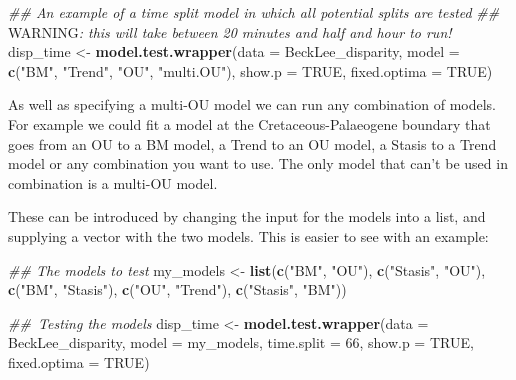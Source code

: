 \documentclass[]{book}
\newenvironment{Shaded}{\begin{snugshade}}{\end{snugshade}}
\newcommand{\AlertTok}[1]{\textcolor[rgb]{0.94,0.16,0.16}{#1}}
\newcommand{\CommentTok}[1]{\textcolor[rgb]{0.56,0.35,0.01}{\textit{#1}}}
\newcommand{\DataTypeTok}[1]{\textcolor[rgb]{0.13,0.29,0.53}{#1}}
\newcommand{\DecValTok}[1]{\textcolor[rgb]{0.00,0.00,0.81}{#1}}
\newcommand{\KeywordTok}[1]{\textcolor[rgb]{0.13,0.29,0.53}{\textbf{#1}}}
\newcommand{\NormalTok}[1]{#1}
\newcommand{\OtherTok}[1]{\textcolor[rgb]{0.56,0.35,0.01}{#1}}
\newcommand{\StringTok}[1]{\textcolor[rgb]{0.31,0.60,0.02}{#1}}
\begin{document}
\begin{Shaded}
\begin{Highlighting}[]
\CommentTok{## An example of a time split model in which all potential splits are tested}
\CommentTok{## }\AlertTok{WARNING}\CommentTok{: this will take between 20 minutes and half and hour to run!}
\NormalTok{disp_time <-}\StringTok{ }\KeywordTok{model.test.wrapper}\NormalTok{(}\DataTypeTok{data =}\NormalTok{ BeckLee_disparity,}
                        \DataTypeTok{model =} \KeywordTok{c}\NormalTok{(}\StringTok{"BM"}\NormalTok{, }\StringTok{"Trend"}\NormalTok{, }\StringTok{"OU"}\NormalTok{, }\StringTok{"multi.OU"}\NormalTok{),}
                                \DataTypeTok{show.p =} \OtherTok{TRUE}\NormalTok{, }\DataTypeTok{fixed.optima =} \OtherTok{TRUE}\NormalTok{)}
\end{Highlighting}
\end{Shaded}

As well as specifying a multi-OU model we can run any combination of models.
For example we could fit a model at the Cretaceous-Palaeogene boundary that goes from an OU to a BM model, a Trend to an OU model, a Stasis to a Trend model or any combination you want to use.
The only model that can't be used in combination is a multi-OU model.

These can be introduced by changing the input for the models into a list, and supplying a vector with the two models.
This is easier to see with an example:

\begin{Shaded}
\begin{Highlighting}[]
\CommentTok{## The models to test}
\NormalTok{my_models <-}\StringTok{ }\KeywordTok{list}\NormalTok{(}\KeywordTok{c}\NormalTok{(}\StringTok{"BM"}\NormalTok{, }\StringTok{"OU"}\NormalTok{),}
                  \KeywordTok{c}\NormalTok{(}\StringTok{"Stasis"}\NormalTok{, }\StringTok{"OU"}\NormalTok{),}
                  \KeywordTok{c}\NormalTok{(}\StringTok{"BM"}\NormalTok{, }\StringTok{"Stasis"}\NormalTok{),}
                  \KeywordTok{c}\NormalTok{(}\StringTok{"OU"}\NormalTok{, }\StringTok{"Trend"}\NormalTok{),}
                  \KeywordTok{c}\NormalTok{(}\StringTok{"Stasis"}\NormalTok{, }\StringTok{"BM"}\NormalTok{))}

\CommentTok{## Testing the models}
\NormalTok{disp_time <-}\StringTok{ }\KeywordTok{model.test.wrapper}\NormalTok{(}\DataTypeTok{data =}\NormalTok{ BeckLee_disparity,}
                                \DataTypeTok{model =}\NormalTok{ my_models, }\DataTypeTok{time.split =} \DecValTok{66}\NormalTok{,}
                                \DataTypeTok{show.p =} \OtherTok{TRUE}\NormalTok{, }\DataTypeTok{fixed.optima =} \OtherTok{TRUE}\NormalTok{)}
\end{Highlighting}
\end{Shaded}
\end{document}
